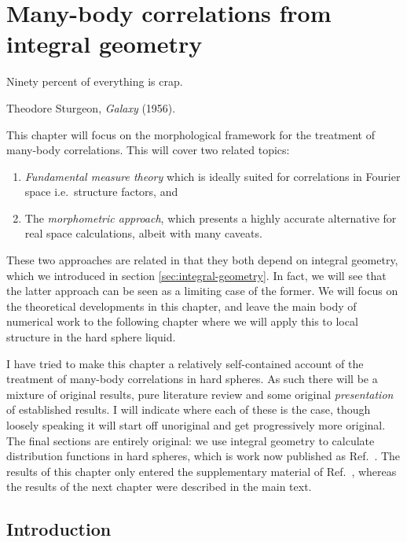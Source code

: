 \documentclass[11pt,twoside]{report}
\begin{document}
\chapter{Many-body correlations from integral geometry}
\epigraph{Ninety percent of everything is crap.}{Theodore Sturgeon, \emph{Galaxy} (1956).}
\label{chapter:morphometric-framework}

This chapter will focus on the morphological framework for the treatment of many-body correlations.
This will cover two related topics:
\begin{enumerate}
\item \emph{Fundamental measure theory} which is ideally suited for correlations in Fourier space i.e.\ structure factors, and
\item The \emph{morphometric approach}, which presents a highly accurate alternative for real space calculations, albeit with many caveats.
\end{enumerate}
These two approaches are related in that they both depend on integral geometry, which we introduced in section \ref{sec:integral-geometry}.
In fact, we will see that the latter approach can be seen as a limiting case of the former.
We will focus on the theoretical developments in this chapter, and leave the main body of numerical work to the following chapter where we will apply this to local structure in the hard sphere liquid.

I have tried to make this chapter a relatively self-contained account of the treatment of many-body correlations in hard spheres.
As such there will be a mixture of original results, pure literature review and some original \emph{presentation} of established results.
I will indicate where each of these is the case, though loosely speaking it will start off unoriginal and get progressively more original.
The final sections are entirely original: we use integral geometry to calculate distribution functions in hard spheres, which is work now published as Ref.\ \cite{RobinsonPRL2019}.
The results of this chapter only entered the supplementary material of Ref.\ \cite{RobinsonPRL2019}, whereas the results of the next chapter were described in the main text.

\section{Introduction}
\end{document}
